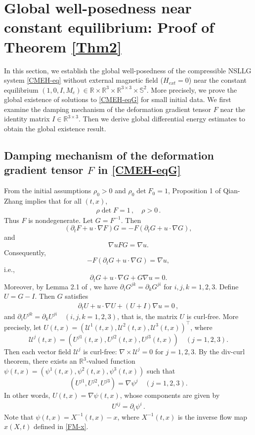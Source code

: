 \documentclass[reqno,11pt]{amsart}
\numberwithin{equation}{section}
\def\p{\partial}
\def\R{\mathbb{R}}
\begin{document}
\section{Global well-posedness near constant equilibrium: Proof of Theorem \ref{Thm2}}\label{Sec:4}

In this section, we establish the global well-posedness of the compressible NSLLG system \eqref{CMEH-eq} without external magnetic field ($H_{{ext}} = 0$) near the constant equilibrium $(1, 0, I, M_e) \in \mathbb{R} \times \mathbb{R}^3 \times \mathbb{R}^{3 \times 3} \times \mathbb{S}^2$. More precisely, we prove the global existence of solutions to \eqref{CMEH-eqG} for small initial data. We first examine the damping mechanism of the deformation gradient tensor $F$ near the identity matrix $I \in \mathbb{R}^{3 \times 3}$. Then we derive global differential energy estimates to obtain the global existence result.

\subsection{Damping mechanism of the deformation gradient tensor $F$ in \eqref{CMEH-eqG}}

From the initial assumptions $\rho_0 > 0$ and $\rho_0 \det F_0 = 1$, Proposition 1 of Qian-Zhang \cite{QZ-ARMA-2010} implies that for all $(t,x)$,
\begin{equation*}
    \begin{aligned}
        \rho \det F = 1 \,, \quad \rho > 0 \,.
    \end{aligned}
\end{equation*}
Thus $F$ is nondegenerate. Let $G = F^{-1}$. Then 
$$(\p_t F+u\cdot \nabla F)G=-F(\p_tG+u\cdot\nabla G),$$
and 
$$\nabla uFG=\nabla u.$$
Consequently,
$$-F(\p_tG+u\cdot\nabla G)=\nabla u,$$ 
i.e., 
$$\p_tG+u\cdot\nabla G+G\nabla u=0.$$
Moreover, by Lemma 2.1 of \cite{Sideris-Thomases-CPAM-2005}, we have $\partial_i G^{jk} = \partial_k G^{ji}$ for $i,j,k = 1,2,3$. Define $U = G - I$. Then $G$ satisfies
\begin{equation}\label{G}
\begin{aligned}
\p_t U+u\cdot \nabla U+(U+I)\nabla u=0\,,
\end{aligned}
\end{equation}
and $\p_iU^{jk}=\p_kU^{ji}\quad (i,j,k=1,2,3)$, that is, the matrix $U$ is curl-free. More precisely, let $U(t,x)= ( \mathscr{U}^1 (t,x), \mathscr{U}^2 (t,x), \mathscr{U}^3 (t,x))^\top $, where 
$$\mathscr{U}^j(t,x)=(U^{j1}(t,x),U^{j2}(t,x),U^{j3}(t,x))\quad(j=1,2,3).$$ 
Then each vector field $\mathscr{U}^j$ is curl-free: $\nabla \times \mathscr{U}^j = 0$ for $j = 1,2,3$. By the div-curl theorem, there exists an $\R^3$-valued function $\psi(t,x)=(\psi^1(t,x),\psi^2(t,x),\psi^3(t,x))$ such that 
$$(U^{j1},U^{j2},U^{j3})=\nabla \psi^j \quad (j=1,2,3).$$
In other words, $U(t,x)=\nabla\psi(t,x)$, whose components are given by
\begin{equation}\label{U}
\begin{aligned}
 U^{ij}=\p_i\psi^i\,.
\end{aligned}
\end{equation}
Note that $\psi(t,x)=X^{-1}(t,x)-x$, where $X^{-1}(t,x)$ is the inverse flow map $x (X, t)$ defined in \eqref{FM-x}.
\end{document}
